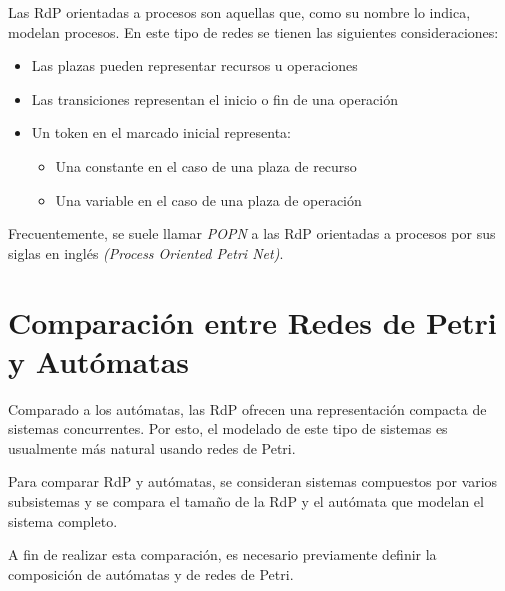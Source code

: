 Las RdP orientadas a procesos son aquellas que, como su nombre lo indica,
modelan procesos. En este tipo de redes se tienen las siguientes
consideraciones:
\begin{itemize}
  \item Las plazas pueden representar recursos u operaciones
  \item Las transiciones representan el inicio o fin de una operación
  \item Un token en el marcado inicial representa:
  \begin{itemize}
      \item Una constante en el caso de una plaza de recurso
      \item Una variable en el caso de una plaza de operación
  \end{itemize}
\end{itemize}

Frecuentemente, se suele llamar \textit{POPN} a las RdP orientadas a procesos
por sus siglas en inglés \textit{(Process Oriented Petri Net)}.

\section{Comparación entre Redes de Petri y Autómatas}
\label{comparacion_rdp_automatas}

Comparado a los autómatas, las RdP ofrecen una representación compacta de
sistemas concurrentes. Por esto, el modelado de este tipo de sistemas es
usualmente más natural usando redes de Petri. \cite{Iordache:2006:SCC:1197724}

Para comparar RdP y autómatas, se consideran sistemas compuestos por varios
subsistemas y se compara el tamaño de la RdP y el autómata que modelan el
sistema completo.

A fin de realizar esta comparación, es necesario previamente definir la
composición de autómatas y de redes de Petri.\cite{Iordache:2006:SCC:1197724}

